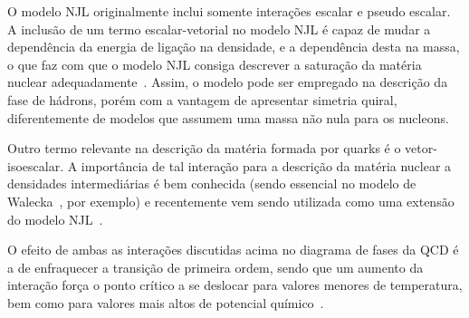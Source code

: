 O modelo NJL originalmente inclui somente interações escalar e pseudo escalar. A inclusão de um termo escalar-vetorial no modelo NJL é capaz de mudar a dependência da energia de ligação na densidade, e a dependência desta na massa, o que faz com que o modelo NJL consiga descrever a saturação da matéria nuclear adequadamente~\parencite{Koch}. Assim, o modelo pode ser empregado na descrição da fase de hádrons, porém com a vantagem de apresentar simetria quiral, diferentemente de modelos que assumem uma massa não nula para os nucleons. 

Outro termo relevante na descrição da matéria formada por quarks é o vetor-isoescalar. A importância de tal interação para a descrição da matéria nuclear a densidades intermediárias é bem conhecida (sendo essencial no modelo de Walecka~\parencite{Advances16}, por exemplo) e recentemente vem sendo utilizada como uma extensão do modelo NJL~\parencite{Abuki, NJLv}.


O efeito de ambas as interações discutidas acima no diagrama de fases da QCD é a de enfraquecer a transição de primeira ordem, sendo que um aumento da interação força o ponto crítico a se deslocar para valores menores de temperatura, bem como para valores mais altos de potencial químico~\parencite{NJLv, japoneses}.

